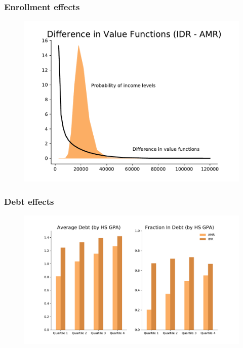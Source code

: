 \documentclass[10pt]{beamer}
\begin{document}
  \begin{frame} \frametitle{Enrollment effects}

    \begin{figure}
      \begin{center}
       \includegraphics[width=\textwidth]{../ms/images/StudentLoans/vf_vs_income_probs.pdf}
      \end{center}
    \end{figure}

  \end{frame}

  \begin{frame} \frametitle{Debt effects}

    \begin{figure}
      \begin{center}
       \includegraphics[width=\textwidth]{../ms/images/StudentLoans/DebtByGPA.pdf}
      \end{center}
    \end{figure}

  \end{frame}
\end{document}
